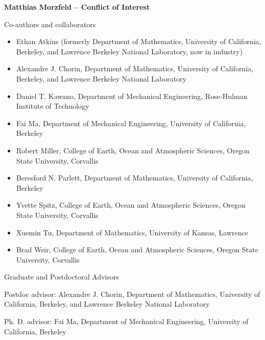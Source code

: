 \documentclass[11pt]{article}
\begin{document}
\begin{center}
{\large{\bf Matthias Morzfeld -- Conflict of Interest}} \\
\end{center}

\vspace{.2 true in}

Co-authors and collaborators
\begin{itemize}
\item Ethan Atkins (formerly Department of Mathematics, University of California, Berkeley, and Lawrence Berkeley National Laboratory, now in industry)
\item Alexandre J. Chorin, Department of Mathematics, University of California, Berkeley, and Lawrence Berkeley National Laboratory
\item Daniel T. Kawano, Department of Mechanical Engineering,  Rose-Hulman Institute of Technology
\item Fai Ma, Department of Mechanical Engineering, University of California, Berkeley
\item Robert Miller, College of Earth, Ocean and Atmospheric Sciences, Oregon State University, Corvallis
\item Beresford N. Parlett, Department of Mathematics, University of California, Berkeley
\item Yvette Spitz, College of Earth, Ocean and Atmospheric Sciences, Oregon State University, Corvallis
\item Xuemin Tu, Department of Mathematics, University of Kansas, Lawrence
\item Brad Weir, College of Earth, Ocean and Atmospheric Sciences, Oregon State University, Corvallis

\end{itemize}


\vspace{.2 true in}
Graduate and Postdoctoral Advisors

\vspace{.1in}
Postdoc advisor: 
Alexandre J. Chorin, Department of Mathematics, University of California, Berkeley, and Lawrence Berkeley National Laboratory

\vspace{.1in}
Ph. D. advisor: 
Fai Ma, Department of Mechanical Engineering, University of California, Berkeley
\end{document}
